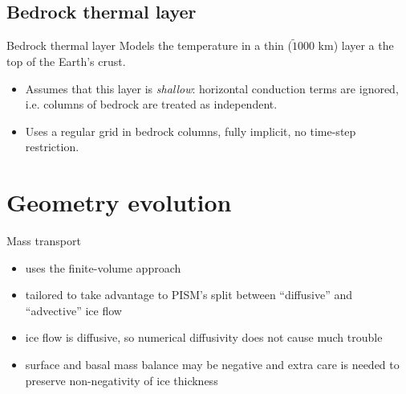 \documentclass[hide notes,intlimits]{beamer}
\begin{document}
\subsection{Bedrock thermal layer}
\label{sec:bedrock}

\begin{frame}{Bedrock thermal layer}
  Models the temperature in a thin ($\tilde 1000$ km) layer a the top
  of the Earth's crust.

  \begin{itemize}
  \item Assumes that this layer is \emph{shallow}: horizontal
    conduction terms are ignored, i.e. columns of bedrock are treated
    as independent.
  \item Uses a regular grid in bedrock columns, fully implicit, no
    time-step restriction.
  \end{itemize}
\end{frame}


\section{Geometry evolution}
\label{sec:geometry-evolution}

\begin{frame}{Mass transport}
  \begin{itemize}
  \item uses the finite-volume approach
  \item tailored to take advantage to PISM's split between
    ``diffusive'' and ``advective'' ice flow
  \item ice flow is diffusive, so numerical diffusivity does not cause
    much trouble
  \item surface and basal mass balance may be negative and extra care
    is needed to preserve non-negativity of ice thickness
  \end{itemize}
\end{frame}

\end{document}
